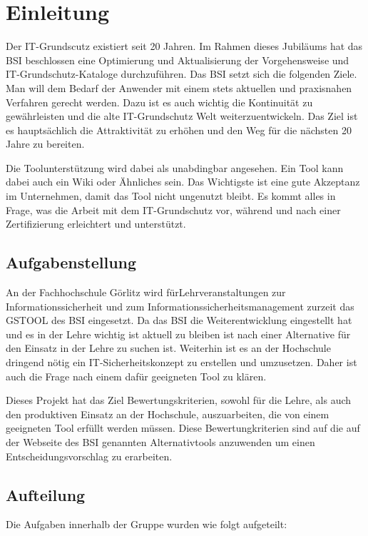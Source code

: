 \section{Einleitung}
Der IT-Grundscutz existiert seit 20 Jahren. Im Rahmen dieses Jubiläums hat das BSI beschlossen eine Optimierung und Aktualisierung der Vorgehensweise und IT-Grundschutz-Kataloge durchzuführen\cite{bsi}. Das BSI setzt sich die folgenden Ziele. Man will dem Bedarf der Anwender mit einem stets aktuellen und praxisnahen Verfahren gerecht werden. Dazu ist es auch wichtig die Kontinuität zu gewährleisten und die alte IT-Grundschutz Welt weiterzuentwickeln. Das Ziel ist es hauptsächlich die Attraktivität zu erhöhen und den Weg für die nächsten 20 Jahre zu bereiten.

Die Toolunterstützung wird dabei als unabdingbar angesehen. Ein Tool kann dabei auch ein Wiki oder Ähnliches sein. Das Wichtigste ist eine gute Akzeptanz im Unternehmen, damit das Tool nicht ungenutzt bleibt. Es kommt alles in Frage, was die Arbeit mit dem IT-Grundschutz vor, während und nach einer Zertifizierung erleichtert und unterstützt.

\subsection{Aufgabenstellung}
An der Fachhochschule Görlitz wird fürLehrveranstaltungen zur Informationssicherheit und zum
Informationssicherheitsmanagement zurzeit das GSTOOL des BSI eingesetzt. Da das BSI die Weiterentwicklung eingestellt hat und es in der Lehre wichtig ist aktuell zu bleiben ist nach einer Alternative für den Einsatz in der Lehre zu suchen ist. 
Weiterhin ist es an der Hochschule dringend nötig ein IT-Sicherheitskonzept zu erstellen und umzusetzen. Daher ist auch die Frage nach einem dafür geeigneten Tool zu klären. 

Dieses Projekt hat das Ziel Bewertungskriterien, sowohl für die Lehre, als auch den produktiven Einsatz an der Hochschule, auszuarbeiten, die von einem geeigneten Tool erfüllt werden müssen. Diese Bewertungkriterien sind auf die auf der Webseite des BSI genannten Alternativtools anzuwenden um einen Entscheidungsvorschlag zu erarbeiten.

\subsection{Aufteilung}
Die Aufgaben innerhalb der Gruppe wurden wie folgt aufgeteilt:

